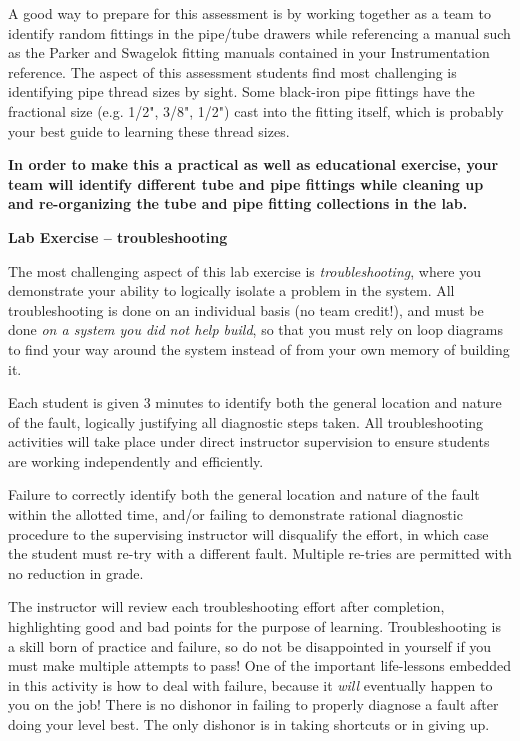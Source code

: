 \vskip 10pt

A good way to prepare for this assessment is by working together as a team to identify random fittings in the pipe/tube drawers while referencing a manual such as the Parker and Swagelok fitting manuals contained in your Instrumentation reference.  The aspect of this assessment students find most challenging is identifying pipe thread sizes by sight.  Some black-iron pipe fittings have the fractional size (e.g. 1/2", 3/8", 1/2") cast into the fitting itself, which is probably your best guide to learning these thread sizes.

\vskip 10pt

{\bf In order to make this a practical as well as educational exercise, your team will identify different tube and pipe fittings while cleaning up and re-organizing the tube and pipe fitting collections in the lab.}  

\vskip 10pt






\vfil \eject

\noindent
{\bf Lab Exercise -- troubleshooting}

\vskip 5pt

The most challenging aspect of this lab exercise is {\it troubleshooting}, where you demonstrate your ability to logically isolate a problem in the system.  All troubleshooting is done on an individual basis (no team credit!), and must be done {\it on a system you did not help build}, so that you must rely on loop diagrams to find your way around the system instead of from your own memory of building it.

Each student is given 3 minutes to identify both the general location and nature of the fault, logically justifying all diagnostic steps taken.  All troubleshooting activities will take place under direct instructor supervision to ensure students are working independently and efficiently. 

Failure to correctly identify both the general location and nature of the fault within the allotted time, and/or failing to demonstrate rational diagnostic procedure to the supervising instructor will disqualify the effort, in which case the student must re-try with a different fault.  Multiple re-tries are permitted with no reduction in grade.

The instructor will review each troubleshooting effort after completion, highlighting good and bad points for the purpose of learning.  Troubleshooting is a skill born of practice and failure, so do not be disappointed in yourself if you must make multiple attempts to pass!  One of the important life-lessons embedded in this activity is how to deal with failure, because it {\it will} eventually happen to you on the job!  There is no dishonor in failing to properly diagnose a fault after doing your level best.  The only dishonor is in taking shortcuts or in giving up.


